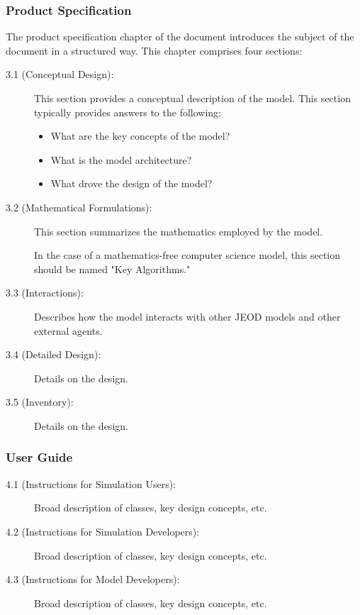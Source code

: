 \subsubsection{Product Specification}
\label{sec:chapterthree}
The product specification chapter of the document introduces the subject of the document
in a structured way. This chapter comprises four sections:
\begin{description}
\item[3.1 (Conceptual Design):] This section provides
a conceptual description of the model.
This section typically provides answers to the following:
\begin{itemize}
\item What are the key concepts of the model?
\item What is the model architecture?
\item What drove the design of the model?
\end{itemize}

\item[3.2 (Mathematical Formulations):] This section summarizes
the mathematics employed by the model.

In the case of a mathematics-free computer science model,
this section should be named "Key Algorithms."
\item[3.3 (Interactions):] Describes how the model interacts with
other JEOD models and other external agents.
\item[3.4 (Detailed Design):] Details on the design.
\item[3.5 (Inventory):] Details on the design.
\end{description}

\subsubsection{User Guide}
\label{sec:chapterfour}
\begin{description}
\item[4.1 (Instructions for Simulation Users):] Broad description of classes, key design concepts, etc.
\item[4.2 (Instructions for Simulation Developers):] Broad description of classes, key design concepts, etc.
\item[4.3 (Instructions for Model Developers):] Broad description of classes, key design concepts, etc.
\end{description}

